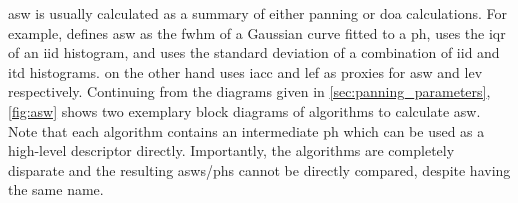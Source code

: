 \documentclass[referee,pdflatex,sn-mathphys-num]{sn-jnl}%
\begin{document}
\gls{asw} is usually calculated as a summary of either panning or \gls{doa} calculations. For example, \cite{sarroffMeasurementsSpaciousnessStereophonic2008} defines \gls{asw} as the \gls{fwhm} of a Gaussian curve fitted to a \gls{ph}, \cite{supperOnsetGuidedSpatialAnalyser2005} uses the \gls{iqr} of an \gls{iid} histogram, and \cite{dewhirstModellingPerceivedSpatial2008} uses the standard deviation of a combination of \gls{iid} and \gls{itd} histograms. \cite{miethObjectiveEvaluationTechniques2017} on the other hand uses \gls{iacc} and \gls{lef} as proxies for \gls{asw} and \gls{lev} respectively. Continuing from the diagrams given in \cref{sec:panning_parameters}, \cref{fig:asw} shows two exemplary block diagrams of algorithms to calculate \gls{asw}. Note that each algorithm contains an intermediate \gls{ph} which can be used as a high-level descriptor directly. Importantly, the algorithms are completely disparate and the resulting \glspl{asw}/\glspl{ph} cannot be directly compared, despite having the same name.
\end{document}
